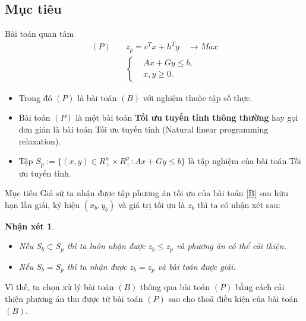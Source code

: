 \documentclass[12pt,a4paper]{report}
\newtheorem{nx}{Nhận xét}
\begin{document}
\subsection*{Mục tiêu}
{Bài toán quan tâm}
\begin{equation}\label{P}
\begin{split}
(P) \quad & z_p=c^Tx+h^Ty \quad \longrightarrow Max \\
            & \left\{\begin{split}
                &Ax+Gy \leq  b, \\
                &x,y \geq 0.
            \end{split}\right.    
\end{split}
\end{equation}
\begin{itemize}
\item Trong đó $(P)$ là bài toán $(B)$ với nghiệm thuộc tập số thực.
\item Bài toán $(P)$ là một bài toán \textbf{Tối ưu tuyến tính thông thường} hay gọi đơn giản là bài toán Tối ưu tuyến tính (Natural linear programming relaxation).
\item Tập $S_p:=\{(x,y)\in R^n_+\times R^p_+: Ax+Gy\leq b\}$ là tập nghiệm của bài toán Tối ưu tuyến tính.
\end{itemize}


{Mục tiêu} %
Giả sử ta nhận được tập phương án tối ưu của bài toán \eqref{B} sau hữu hạn lần giải, ký hiệu $(x_b, y_b)$ và giá trị tối ưu là $z_b$ thì ta có nhận xét sau:
\begin{nx} \label{nx}
\phantom{abc}
\begin{itemize}
\item Nếu $S_b \subset S_p$ thì ta luôn nhận được $z_b \leq z_p$ và phương án có thể cải thiện.
\item Nếu $S_b = S_p$ thì ta nhận được $z_b = z_p$ và bài toán được giải.
\end{itemize}    
\end{nx}
Vì thế, ta chọn xử lý bài toán $(B)$ thông qua bài toán $(P)$ bằng cách cải thiện phương án thu được từ bài toán $(P)$ sao cho thoả điều kiện của bài toán $(B)$.
\end{document}

